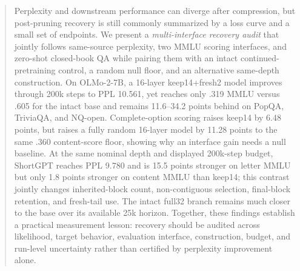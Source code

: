 \begin{abstract}
Perplexity and downstream performance can diverge after compression, but
post-pruning recovery is still commonly summarized by a loss curve and a small
set of endpoints. We present a \emph{multi-interface recovery audit} that
jointly follows same-source perplexity, two MMLU scoring
interfaces, and zero-shot closed-book QA while pairing them with an intact
continued-pretraining control, a random null floor, and an alternative
same-depth construction. On OLMo-2-7B, a 16-layer keep14+fresh2 model improves
through 200k steps to PPL 10.561, yet reaches only .319 MMLU versus .605 for the
intact base and remains 11.6--34.2 points behind on PopQA, TriviaQA, and
NQ-open. Complete-option scoring raises keep14 by 6.48 points, but raises a
fully random 16-layer model by 11.28 points to the same .360 content-score
floor, showing why an interface gain needs a null baseline. At the same nominal
depth and displayed 200k-step budget, ShortGPT reaches PPL 9.780 and is
15.5 points stronger on letter MMLU but only 1.8 points stronger on content
MMLU than keep14; this contrast jointly changes inherited-block count,
non-contiguous selection, final-block retention, and fresh-tail use. The intact
full32 branch remains much
closer to the base over its available 25k horizon. Together, these findings
establish a practical measurement lesson: recovery should be audited across
likelihood, target behavior, evaluation interface, construction, budget, and
run-level uncertainty rather than certified by perplexity improvement alone.
\end{abstract}
